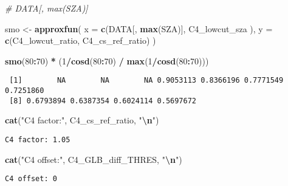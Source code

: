 \documentclass[
  10pt,
  a4paper,oneside]{article}
\newenvironment{Shaded}{\begin{snugshade}}{\end{snugshade}}
\newcommand{\AttributeTok}[1]{\textcolor[rgb]{0.13,0.29,0.53}{#1}}
\newcommand{\CommentTok}[1]{\textcolor[rgb]{0.56,0.35,0.01}{\textit{#1}}}
\newcommand{\DecValTok}[1]{\textcolor[rgb]{0.00,0.00,0.81}{#1}}
\newcommand{\FunctionTok}[1]{\textcolor[rgb]{0.13,0.29,0.53}{\textbf{#1}}}
\newcommand{\NormalTok}[1]{#1}
\newcommand{\OtherTok}[1]{\textcolor[rgb]{0.56,0.35,0.01}{#1}}
\newcommand{\SpecialCharTok}[1]{\textcolor[rgb]{0.81,0.36,0.00}{\textbf{#1}}}
\newcommand{\StringTok}[1]{\textcolor[rgb]{0.31,0.60,0.02}{#1}}
\begin{document}
\begin{Shaded}
\begin{Highlighting}[]
\CommentTok{\# DATA[, max(SZA)]}

\NormalTok{smo }\OtherTok{\textless{}{-}} \FunctionTok{approxfun}\NormalTok{(}
    \AttributeTok{x =} \FunctionTok{c}\NormalTok{(DATA[, }\FunctionTok{max}\NormalTok{(SZA)], C4\_lowcut\_sza  ),}
    \AttributeTok{y =} \FunctionTok{c}\NormalTok{(C4\_lowcut\_ratio,  C4\_cs\_ref\_ratio)}
\NormalTok{    )}

\FunctionTok{smo}\NormalTok{(}\DecValTok{80}\SpecialCharTok{:}\DecValTok{70}\NormalTok{) }\SpecialCharTok{*}\NormalTok{ (}\DecValTok{1}\SpecialCharTok{/}\FunctionTok{cosd}\NormalTok{(}\DecValTok{80}\SpecialCharTok{:}\DecValTok{70}\NormalTok{) }\SpecialCharTok{/} \FunctionTok{max}\NormalTok{(}\DecValTok{1}\SpecialCharTok{/}\FunctionTok{cosd}\NormalTok{(}\DecValTok{80}\SpecialCharTok{:}\DecValTok{70}\NormalTok{)))}
\end{Highlighting}
\end{Shaded}

\begin{verbatim}
 [1]        NA        NA        NA 0.9053113 0.8366196 0.7771549 0.7251860
 [8] 0.6793894 0.6387354 0.6024114 0.5697672
\end{verbatim}

\begin{Shaded}
\begin{Highlighting}[]
\FunctionTok{cat}\NormalTok{(}\StringTok{"C4 factor:"}\NormalTok{, C4\_cs\_ref\_ratio,   }\StringTok{"}\SpecialCharTok{\textbackslash{}n}\StringTok{"}\NormalTok{)}
\end{Highlighting}
\end{Shaded}

\begin{verbatim}
C4 factor: 1.05 
\end{verbatim}

\begin{Shaded}
\begin{Highlighting}[]
\FunctionTok{cat}\NormalTok{(}\StringTok{"C4 offset:"}\NormalTok{, C4\_GLB\_diff\_THRES, }\StringTok{"}\SpecialCharTok{\textbackslash{}n}\StringTok{"}\NormalTok{)}
\end{Highlighting}
\end{Shaded}

\begin{verbatim}
C4 offset: 0 
\end{verbatim}
\end{document}

